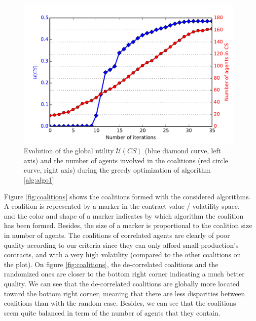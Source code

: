 \documentclass[conference]{IEEEtran}
\begin{document}
\begin{figure}
\includegraphics[scale=.6]{search.pdf}
\caption{Evolution of the global utility $ \mathcal{U}(CS) $ (blue diamond curve, left axis) and the number of agents involved in the coalitions (red circle curve, right axis) during the greedy optimization of algorithm \ref{alg:algo1} }
\label{fig:search}
\end{figure}


Figure \ref{fig:coalitions} shows the coalitions formed with the considered algorithms. A coalition is represented by a marker in the contract value / volatility space, and the color and shape of a marker indicates by which algorithm the coalition has been formed. Besides, the size of a marker is proportional to the coalition size in number of agents. The coalitions of correlated agents are clearly of poor quality according to our criteria since they can only afford small production's contracts, and with a very high volatility (compared to the other coalitions on the plot). On figure \ref{fig:coalitions}, the de-correlated coalitions and the randomized ones are closer to the bottom right corner indicating a much better quality. We can see that the de-correlated coalitions are globally more located toward the bottom right corner, meaning that there are less disparities between coalitions than with the random case. Besides, we can see that the coalitions seem quite balanced in term of the number of agents that they contain.  
\end{document}
